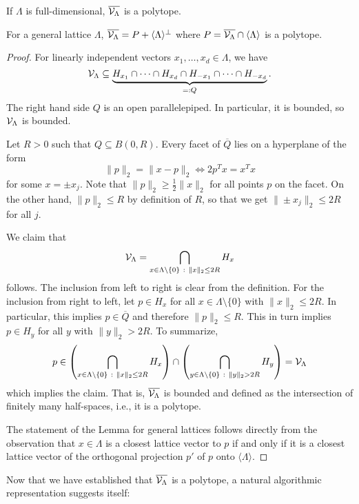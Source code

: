 \begin{lemma}
  If $\Lambda$ is full-dimensional, $\overline{\mathcal{V}_\Lambda}$ is a polytope.

  For a general lattice $\Lambda$,
  $\overline{\mathcal{V}_\Lambda} = P + \langle \Lambda \rangle^\bot$
  where $P = \overline{\mathcal{V}_\Lambda} \cap \langle \Lambda \rangle$ is a polytope.
\end{lemma}
\begin{proof}
  For linearly independent vectors $x_1, \ldots, x_d \in \Lambda$,
  we have
  \[
    \mathcal{V}_\Lambda \subseteq
      \underbrace{H_{x_1} \cap \dots \cap H_{x_d} \cap H_{-x_1} \cap \dots \cap H_{-x_d}}_{=: Q}.
  \]
  The right hand side $Q$ is an open parallelepiped.
  In particular, it is bounded, so $\mathcal{V}_\Lambda$ is bounded.

  Let $R > 0$ such that $Q \subseteq B(0,R)$.
  Every facet of $\overline{Q}$ lies on a hyperplane of the form
  \[
    \|p\|_2 = \|x - p\|_2 \iff 2p^Tx = x^Tx
  \]
  for some $x = \pm x_j$.
  Note that $\|p\|_2 \geq \frac{1}{2} \|x\|_2$ for all points $p$ on the facet.
  On the other hand, $\|p\|_2 \leq R$ by definition of $R$,
  so that we get $\|\pm x_j\|_2 \leq 2R$ for all $j$.

  We claim that
  \[
    \mathcal{V}_\Lambda = \bigcap_{x \in \Lambda\setminus\{0\} ~:~ \|x\|_2 \leq 2R} H_x
  \]
  follows.
  The inclusion from left to right is clear from the definition.
  For the inclusion from right to left,
  let $p \in H_x$ for all $x \in \Lambda\setminus\{0\}$ with $\|x\|_2 \leq 2R$.
  In particular, this implies $p \in \overline{Q}$ and therefore $\|p\|_2 \leq R$.
  This in turn implies $p \in H_y$ for all $y$ with $\|y\|_2 > 2R$.
  To summarize,
  \[
     p \in \left( \bigcap_{x \in \Lambda\setminus\{0\} ~:~ \|x\|_2 \leq 2R} H_x \right)
      \cap \left( \bigcap_{y \in \Lambda\setminus\{0\} ~:~ \|y\|_2 > 2R} H_y \right) = \mathcal{V}_\Lambda
  \]
  which implies the claim.
  That is, $\overline{\mathcal{V}_\Lambda}$ is bounded and defined as the intersection of finitely many half-spaces,
  i.e., it is a polytope.

  The statement of the Lemma for general lattices follows
  directly from the observation that $x \in \Lambda$ is a closest lattice vector to $p$
  if and only if it is a closest lattice vector of the orthogonal projection $p'$ of $p$
  onto $\langle \Lambda \rangle$.
\end{proof}

Now that we have established that $\overline{\mathcal{V}_\Lambda}$ is a polytope,
a natural algorithmic representation suggests itself:

